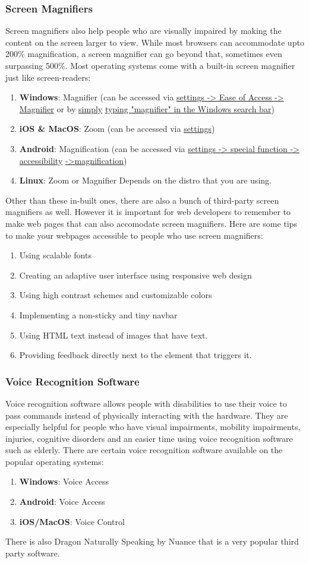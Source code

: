 \documentclass[11pt]{article}
\begin{document}
\subsubsection{Screen Magnifiers}
\label{sec:org89474b4}
Screen magnifiers also help people who are visually impaired by making the content on the screen
larger to view. While most browsers can accommodate upto 200\% magnification, a screen magnifier can
go beyond that, sometimes even surpassing 500\%. Most operating systems come with a built-in screen
magnifier just like screen-readers:
\begin{enumerate}
\item \textbf{Windows}: Magnifier (can be accessed via \uline{settings -> Ease of Access -> Magnifier} or by \uline{simply}
\uline{typing "magnifier" in the Windows search bar})
\item \textbf{iOS \& MacOS}: Zoom (can be accessed via \uline{settings})
\item \textbf{Android}: Magnification (can be accessed via \uline{settings -> special function -> accessibility}
\uline{->magnification})
\item \textbf{Linux}: Zoom or Magnifier
Depends on the distro that you are using.
\end{enumerate}
Other than these in-built ones, there are also a bunch of third-party screen magnifiers as well.
However it is important for web developers to remember to make
web pages that can also accomodate screen magnifiers. Here are some tips to make your webpages
accessible to people who use screen magnifiers:
\begin{enumerate}
\item Using scalable fonts
\item Creating an adaptive user interface using responsive web design
\item Using high contrast schemes and customizable colors
\item Implementing a non-sticky and tiny navbar
\item Using HTML text instead of images that have text.
\item Providing feedback directly next to the element that triggers it.
\end{enumerate}
\subsubsection{Voice Recognition Software}
\label{sec:org9f7216e}
Voice recognition software allows people with disabilities to use their voice to pass commands
instead of physically interacting with the hardware. They are especially helpful for people who have
visual impairments, mobility impairments, injuries, cognitive disorders and an easier time using
voice recognition software such as elderly.
There are certain voice recognition software available on the popular operating systems:
\begin{enumerate}
\item \textbf{Windows}: Voice Access
\item \textbf{Android}: Voice Access
\item \textbf{iOS/MacOS}: Voice Control
\end{enumerate}
There is also Dragon Naturally Speaking by Nuance that is a very popular third party software.
\end{document}
